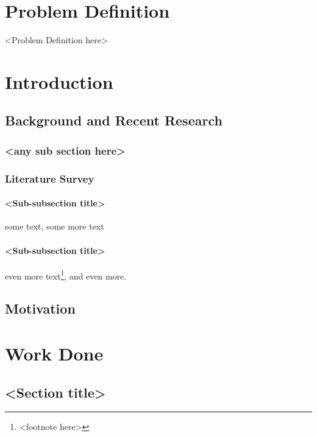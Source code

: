 \documentclass[12pt,a4paper]{report}
\begin{document}
\chapter{Problem Definition}

<Problem Definition here>



\chapter{Introduction}

\section{Background and Recent Research}
\subsection{<any sub section here>}

\subsection{Literature Survey}

\subsubsection{<Sub-subsection title>}
some text\cite{citation-1-name-here}, some more text

\subsubsection{<Sub-subsection title>}
even more text\footnote{<footnote here>}, and even more.

\section{Motivation}


\chapter{Work Done}

\section{<Section title>}
\end{document}
